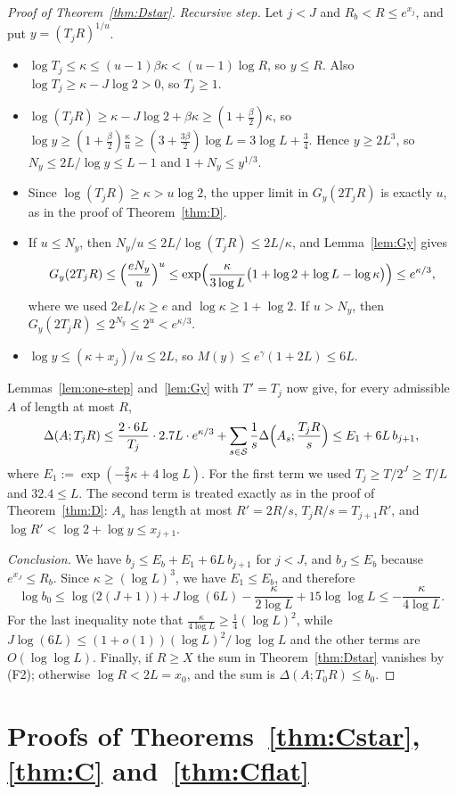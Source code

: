 \begin{proof}[Proof of Theorem~\ref{thm:Dstar}]
\emph{Recursive step.} Let $j<J$ and $R_b<R\le e^{x_j}$, and put $y=(T_jR)^{1/u}$.
\begin{itemize}[leftmargin=*]
\item $\log T_j\le\kappa\le(u-1)\beta\kappa<(u-1)\log R$, so $y\le R$. Also $\log T_j\ge\kappa-J\log2>0$, so $T_j\ge1$.
\item $\log(T_jR)\ge\kappa-J\log2+\beta\kappa\ge(1+\frac\beta2)\kappa$, so
$\log y\ge(1+\frac\beta2)\frac\kappa u\ge(3+\frac{3\beta}2)\log L=3\log L+\frac34$. Hence $y\ge2L^3$, so
$N_y\le2L/\log y\le L-1$ and $1+N_y\le y^{1/3}$.
\item Since $\log(T_jR)\ge\kappa>u\log2$, the upper limit in $G_y(2T_jR)$ is exactly $u$, as in the proof of
Theorem~\ref{thm:D}.
\item If $u\le N_y$, then $N_y/u\le2L/\log(T_jR)\le2L/\kappa$, and Lemma~\ref{lem:Gy} gives
\[
G_y(2T_jR)\le\Bigl(\frac{eN_y}u\Bigr)^u\le\exp\Bigl(\frac{\kappa}{3\log L}\bigl(1+\log2+\log L-\log\kappa\bigr)\Bigr)
\le e^{\kappa/3},
\]
where we used $2eL/\kappa\ge e$ and $\log\kappa\ge1+\log2$. If $u>N_y$, then $G_y(2T_jR)\le2^{N_y}\le2^u<e^{\kappa/3}$.
\item $\log y\le(\kappa+x_j)/u\le2L$, so $M(y)\le e^\gamma(1+2L)\le6L$.
\end{itemize}
Lemmas~\ref{lem:one-step} and~\ref{lem:Gy} with $T'=T_j$ now give, for every admissible $A$ of length at most $R$,
\[
\Delta(A;T_jR)\le\frac{2\cdot6L}{T_j}\cdot2.7L\cdot e^{\kappa/3}+\sum_{s\in\mathcal{S}}\frac1s\Delta\Bigl(A_s;\frac{T_jR}s\Bigr)
\le E_1+6L\,b_{j+1},
\]
where $E_1:=\exp(-\frac23\kappa+4\log L)$. For the first term we used $T_j\ge T/2^J\ge T/L$ and $32.4\le L$. The
second term is treated exactly as in the proof of Theorem~\ref{thm:D}: $A_s$ has length at most $R'=2R/s$,
$T_jR/s=T_{j+1}R'$, and $\log R'<\log2+\log y\le x_{j+1}$.

\emph{Conclusion.} We have $b_j\le E_b+E_1+6L\,b_{j+1}$ for $j<J$, and $b_J\le E_b$ because $e^{x_J}\le R_b$. Since $\kappa\ge(\log L)^3$, we
have $E_1\le E_b$, and therefore
\[
\log b_0\le\log\bigl(2(J+1)\bigr)+J\log(6L)-\frac{\kappa}{2\log L}+15\log\log L\le-\frac{\kappa}{4\log L}.
\]
For the last inequality note that $\frac{\kappa}{4\log L}\ge\frac14(\log L)^2$, while
$J\log(6L)\le(1+o(1))(\log L)^2/\log\log L$ and the other terms are $O(\log\log L)$. Finally, if $R\ge X$ the sum in
Theorem~\ref{thm:Dstar} vanishes by (F2); otherwise $\log R<2L=x_0$, and the sum is $\Delta(A;T_0R)\le b_0$.
\end{proof}

\section{Proofs of Theorems~\texorpdfstring{\ref{thm:Cstar}, \ref{thm:C} and~\ref{thm:Cflat}}{C*, C and C-flat}}\label{sec:proof-C}

